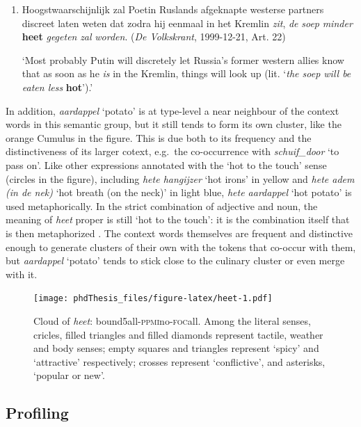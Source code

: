 \documentclass[
]{book}
\begin{document}
\begin{enumerate}
\def\labelenumi{(\arabic{enumi})}
\setcounter{enumi}{33}
\item
  Hoogstwaarschijnlijk zal Poetin Ruslands afgeknapte westerse partners discreet laten weten dat zodra hij eenmaal in het Kremlin \emph{zit}, \emph{de} \emph{soep} \emph{minder} \textbf{heet} \emph{gegeten} \emph{zal} \emph{worden}. (\emph{De Volkskrant}, 1999-12-21, Art. 22)

  `Most probably Putin will discretely let Russia's former western allies know that as soon as he \emph{is} in the Kremlin, things will look up (lit. `\emph{the soep will be eaten less} \textbf{hot}').'
\end{enumerate}

In addition, \emph{aardappel} `potato' is at type-level a near neighbour of the context words in this semantic group, but it still tends to form its own cluster, like the orange Cumulus in the figure. This is due both to its frequency and the distinctiveness of its larger cotext, e.g.~the co-occurrence with \emph{schuif\_door} `to pass on'. Like other expressions annotated with the `hot to the touch' sense (circles in the figure), including \emph{hete hangijzer} `hot irons' in yellow and \emph{hete adem (in de nek)} `hot breath (on the neck)' in light blue, \emph{hete aardappel} `hot potato' is used metaphorically. In the strict combination of adjective and noun, the meaning of \emph{heet} proper is still `hot to the touch': it is the combination itself that is then metaphorized \autocite[for a discussion see][]{geeraerts_2003}.
The context words themselves are frequent and distinctive enough to generate clusters of their own with the tokens that co-occur with them, but \emph{aardappel} `potato' tends to stick close to the culinary cluster or even merge with it.



\begin{figure}
\centering
\texttt{[image: phdThesis\_files/figure-latex/heet-1.pdf]}
\caption{\label{fig:heet}Cloud of \emph{heet}: bound5all-\textsc{ppmi}no-\textsc{foc}all. Among the literal senses, cricles, filled triangles and filled diamonds represent tactile, weather and body senses; empty squares and triangles represent `spicy' and `attractive' respectively; crosses represent `conflictive', and asterisks, `popular or new'.}
\end{figure}

\hypertarget{profiling-1}{%
\subsection{Profiling}\label{profiling-1}}
\end{document}
